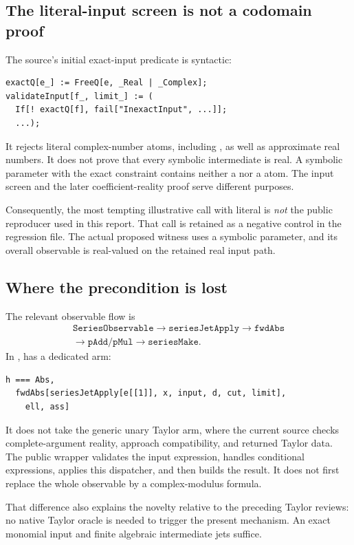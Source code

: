 \documentclass[11pt]{article}
\newcommand{\code}[1]{\texttt{\detokenize{#1}}}
\theoremstyle{remark}\newtheorem{remark}[theorem]{Remark}
\begin{document}
\subsection{The literal-input screen is not a codomain proof}
The source's initial exact-input predicate is syntactic:
\begin{lstlisting}
exactQ[e_] := FreeQ[e, _Real | _Complex];
validateInput[f_, limit_] := (
  If[! exactQ[f], fail["InexactInput", ...]];
  ...);
\end{lstlisting}
It rejects literal complex-number atoms, including \code{I}, as well as
approximate real numbers. It does not prove that every symbolic intermediate
is real. A symbolic parameter \code{a} with the exact constraint
\code{a^2 == -1} contains neither a \code{Real} nor a \code{Complex} atom.
The input screen and the later coefficient-reality proof serve different
purposes.\cite{core}

Consequently, the most tempting illustrative call with literal \code{I} is
\emph{not} the public reproducer used in this report. That call is retained as
a negative control in the regression file. The actual proposed witness uses
a symbolic parameter, and its overall observable is real-valued on the
retained real input path.

\subsection{Where the precondition is lost}
The relevant observable flow is
\[
\begin{gathered}
\texttt{SeriesObservable}\longrightarrow \texttt{seriesJetApply}\longrightarrow \texttt{fwdAbs}\\
\longrightarrow \texttt{pAdd}/\texttt{pMul}\longrightarrow \texttt{seriesMake}.
\end{gathered}
\]
In \code{seriesJetApply}, \code{Abs} has a dedicated arm:
\begin{lstlisting}
h === Abs,
  fwdAbs[seriesJetApply[e[[1]], x, input, d, cut, limit],
    ell, ass]
\end{lstlisting}
It does not take the generic unary Taylor arm, where the current source checks
complete-argument reality, approach compatibility, and returned Taylor data.
The public wrapper validates the input expression, handles conditional
expressions, applies this dispatcher, and then builds the result. It does not
first replace the whole observable by a complex-modulus formula.\cite{operations}

That difference also explains the novelty relative to the preceding Taylor
reviews: no native Taylor oracle is needed to trigger the present mechanism.
An exact monomial input and finite algebraic intermediate jets suffice.
\end{document}
